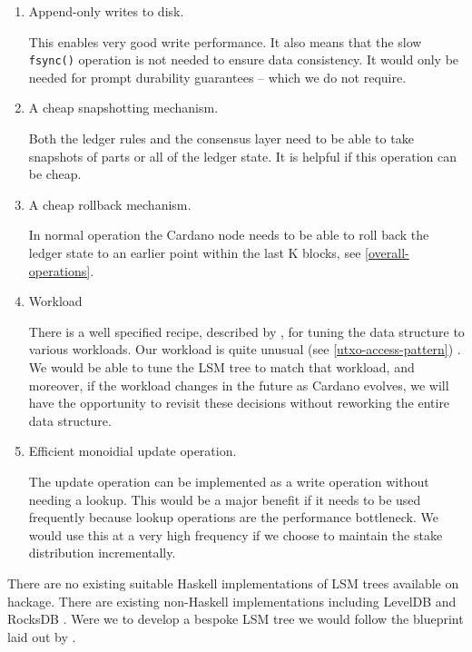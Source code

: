 \documentclass[11pt,a4paper]{article}
\begin{document}
\begin{enumerate}
  \item Append-only writes to disk.

        This enables very good write performance. It also means that the slow
        {\tt fsync()} operation is not needed to ensure data consistency. It
        would only be needed for prompt durability guarantees -- which we do
        not require.

  \item A cheap snapshotting mechanism.

        Both the ledger rules and the consensus layer need to be able to take
        snapshots of parts or all of the ledger state. It is helpful if this
        operation can be cheap.

  \item A cheap rollback mechanism.

        In normal operation the Cardano node needs to be able to roll back the
        ledger state to an earlier point within the last K blocks, see
        \cref{overall-operations}.

  \item Workload

        There is a  well specified recipe, described by \cite{monkey}, for
        tuning the data structure to various workloads. Our workload is quite
        unusual (see \cref{utxo-access-pattern}) . We would be able to tune the
        LSM tree to match that workload, and moreover, if the workload changes
        in the future as Cardano evolves, we will have the opportunity to
        revisit these decisions without reworking the entire data structure.

  \item Efficient monoidial {\sc update} operation.

        The {\sc update} operation can be implemented as a write operation
        without needing a {\sc lookup}. This would be a major benefit if it
        needs to be used frequently because {\sc lookup} operations are the
        performance bottleneck. We would use this at a very high frequency if
        we choose to maintain the stake distribution incrementally.
\end{enumerate}

There are no existing suitable Haskell implementations of LSM trees available
on hackage. There are existing non-Haskell implementations including LevelDB
and RocksDB . Were we to develop a bespoke LSM tree we would follow the
blueprint laid out by \cite{monkey}.
\end{document}
